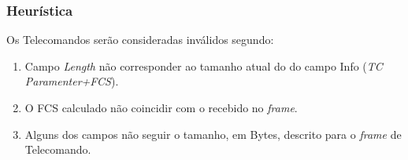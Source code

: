 \subsubsection{Heurística}

Os Telecomandos serão consideradas inválidos segundo:

\begin{enumerate}
    \item Campo \textit{Length} não corresponder ao tamanho atual do do campo Info (\textit{TC Paramenter+FCS}).
    \item O FCS calculado não coincidir com o recebido no \textit{frame}.
    \item Alguns dos campos não seguir o tamanho, em Bytes, descrito para o \textit{frame} de Telecomando.
\end{enumerate}